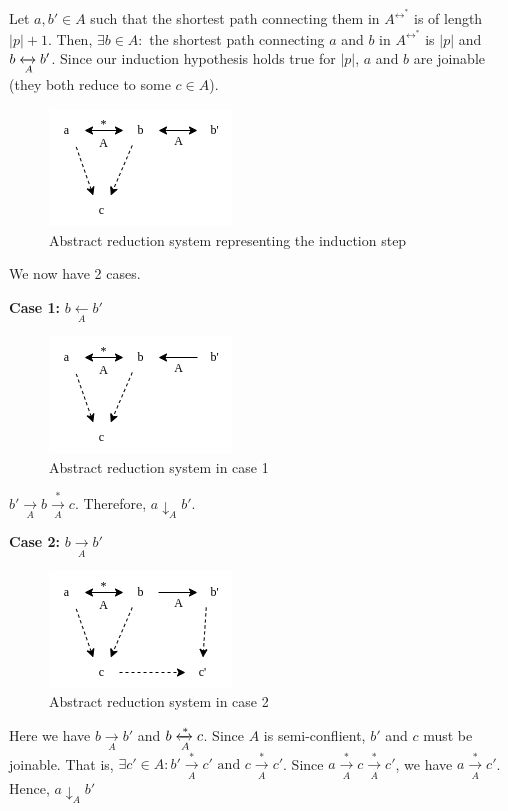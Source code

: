 Let $a, b' \in A$ such that the shortest path connecting them in $A^{\leftrightarrow ^*}$ is of length $|p|+1$. Then, $\exists b \in A :$ the shortest path connecting $a$ and $b$ in $A^{\leftrightarrow ^*}$ is $|p|$ and $b \xleftrightarrow[A]{} b'$. Since our induction hypothesis holds true for $|p|$, $a$ and $b$ are joinable (they both reduce to some $c \in A$).


\begin{figure}[htbp]
    \center
    \includegraphics[scale=0.8]{images/lecture1/induction1.png}
    \caption{Abstract reduction system representing the induction step}
\end{figure}
We now have 2 cases. 

\textbf{Case 1:} $b \xleftarrow[A]{} b'$ 

\begin{figure}[htbp]
    \center
    \includegraphics[scale=0.8]{images/lecture1/induction2.png}
    \caption{Abstract reduction system in case 1}
\end{figure}
$b' \xrightarrow[A]{} b \xrightarrow[A]{*} c$. Therefore, $a \downarrow _A b'$. 

\textbf{Case 2:} $b \xrightarrow[A]{} b'$

\begin{figure}[htbp]
    \center
    \includegraphics[scale=0.8]{images/lecture1/induction3.png}
    \caption{Abstract reduction system in case 2}
\end{figure}
Here we have $b \xrightarrow[A]{} b'$ and $b \xleftrightarrow[A]{*} c$. Since $A$ is semi-conflient, $b'$ and $c$ must be joinable. That is, $\exists c' \in A : b' \xrightarrow[A]{*} c' \text{ and } c \xrightarrow[A]{*} c'$.  Since $a \xrightarrow[A]{*} c \xrightarrow[A]{*} c'$, we have $a \xrightarrow[A]{*} c'$. Hence, $a \downarrow _A b'$



